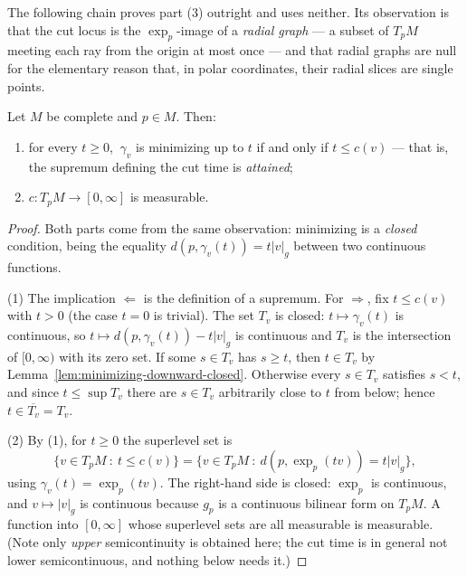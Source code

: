 The following chain proves part (3) outright and uses neither. Its
observation is that the cut locus is the $\exp_p$-image of a
\emph{radial graph} --- a subset of $T_pM$ meeting each ray from the
origin at most once --- and that radial graphs are null for the
elementary reason that, in polar coordinates, their radial slices are
single points.

\begin{lemma}
\label{lem:cut-time-measurable}
\leanok
Let $M$ be complete and $p\in M$. Then:
\begin{enumerate}
\item for every $t\ge0$, $\ \gamma_v$ is minimizing up to $t$ if and
only if $t\le c(v)$ --- that is, the supremum defining the cut time is
\emph{attained};
\item $c\colon T_pM\to[0,\infty]$ is measurable.
\end{enumerate}
\end{lemma}

\begin{proof}
\leanok
Both parts come from the same observation: minimizing is a
\emph{closed} condition, being the equality
$d(p,\gamma_v(t))=t\lvert v\rvert_g$ between two continuous functions.

(1) The implication $\Leftarrow$ is the definition of a supremum. For
$\Rightarrow$, fix $t\le c(v)$ with $t>0$ (the case $t=0$ is trivial).
The set $T_v$ is closed: $t\mapsto\gamma_v(t)$ is continuous, so
$t\mapsto d(p,\gamma_v(t))-t\lvert v\rvert_g$ is continuous and $T_v$
is the intersection of $[0,\infty)$ with its zero set. If some $s\in
T_v$ has $s\ge t$, then $t\in T_v$ by
Lemma~\ref{lem:minimizing-downward-closed}. Otherwise every $s\in T_v$
satisfies $s<t$, and since $t\le\sup T_v$ there are $s\in T_v$
arbitrarily close to $t$ from below; hence $t\in\overline{T_v}=T_v$.

(2) By (1), for $t\ge0$ the superlevel set is
$$\{v\in T_pM\ :\ t\le c(v)\}
=\{v\in T_pM\ :\ d(p,\exp_p(tv))=t\lvert v\rvert_g\},$$
using $\gamma_v(t)=\exp_p(tv)$. The right-hand side is closed: $\exp_p$
is continuous, and $v\mapsto\lvert v\rvert_g$ is continuous because
$g_p$ is a continuous bilinear form on $T_pM$. A function into
$[0,\infty]$ whose superlevel sets are all measurable is measurable.
(Note only \emph{upper} semicontinuity is obtained here; the cut time
is in general not lower semicontinuous, and nothing below needs it.)
\end{proof}

